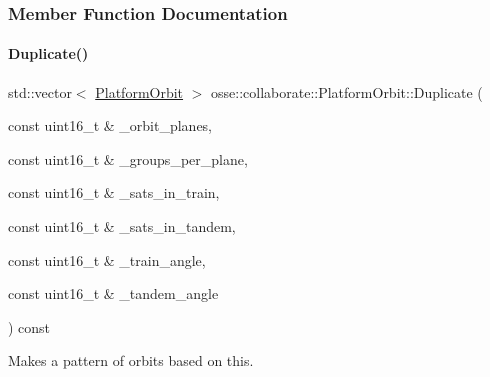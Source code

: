 \subsubsection{Member Function Documentation}
\mbox{\label{classosse_1_1collaborate_1_1_platform_orbit_a7c11526ed7a47023520c8fbf3605b4c4}} 
\paragraph{\texorpdfstring{Duplicate()}{Duplicate()}}
{\footnotesize\ttfamily std\+::vector$<$ \hyperlink{classosse_1_1collaborate_1_1_platform_orbit}{Platform\+Orbit} $>$ osse\+::collaborate\+::\+Platform\+Orbit\+::\+Duplicate (\begin{DoxyParamCaption}\item[{const uint16\+\_\+t \&}]{\+\_\+orbit\+\_\+planes,  }\item[{const uint16\+\_\+t \&}]{\+\_\+groups\+\_\+per\+\_\+plane,  }\item[{const uint16\+\_\+t \&}]{\+\_\+sats\+\_\+in\+\_\+train,  }\item[{const uint16\+\_\+t \&}]{\+\_\+sats\+\_\+in\+\_\+tandem,  }\item[{const uint16\+\_\+t \&}]{\+\_\+train\+\_\+angle,  }\item[{const uint16\+\_\+t \&}]{\+\_\+tandem\+\_\+angle }\end{DoxyParamCaption}) const}



Makes a pattern of orbits based on this. 


